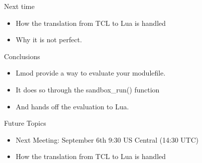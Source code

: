 \documentclass{beamer}
\begin{document}
\begin{frame}{Next time}
  \begin{itemize}
    \item How the translation from TCL to Lua is handled
    \item Why it is not perfect.
  \end{itemize}
\end{frame}

\begin{frame}{Conclusions}
  \begin{itemize}
    \item Lmod provide a way to evaluate your modulefile.
    \item It does so through the sandbox\_run() function
    \item And hands off the evaluation to Lua.
  \end{itemize}
\end{frame}

\begin{frame}{Future Topics}
  \begin{itemize}
    \item Next Meeting: September 6th 9:30 US Central (14:30 UTC)
    \item How the translation from TCL to Lua is handled
  \end{itemize}
\end{frame}
\end{document}
